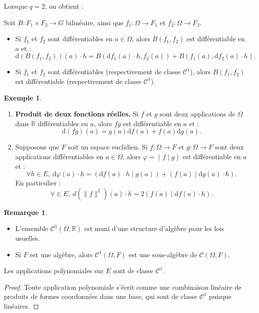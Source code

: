 \documentclass[french]{article}
\newcommand{\R}{\mathbb{R}}
\renewcommand{\d}{\text{d}}
\theoremstyle{plain}
\theoremstyle{definition}
\newtheorem*{ex}{Exemple}
\newtheorem*{rmq}{Remarque}
\theoremstyle{remark}
\begin{document}
Lorsque $q=2$, on obtient :

\begin{cor}%
	Soit $B: F_1\times F_2\to G$ bilinéaire, ainsi que $f_1:\Omega\to F_1$ et $f_2:\Omega\to F_2$.
	\begin{itemize}
		\item Si $f_1$ et $f_2$ sont différentiables en $a\in\Omega$, alors $B(f_1,f_2)$ est différentiable en $a$ et :
		$$\d(B(f_1,f_2))(a)\cdot h=B(\d f_1(a)\cdot h, f_2(a))+B(f_1(a),\d f_2(a)\cdot h).$$
		\item Si $f_1$ et $f_2$ sont différentiables (respectivement de classe $\mathcal{C}^1$), alors $B(f_1,f_2)$ est différentiable (respectivement de classe $\mathcal{C}^1$).
	\end{itemize}
\end{cor}

\begin{ex}
	\begin{enumerate}
		\item \textbf{Produit de deux fonctions réelles.} Si $f$ et $g$ sont deux applications de $\Omega$ dans $\R$ différentiables en $a$, alors $fg$ est différentiable en $a$ et :
		$$\d (fg)(a)=g(a)\d f(a)+f(a)\d g(a).$$
		\item Supposons que $F$ soit un espace euclidien. Si $f:\Omega\to F$ et $g:\Omega\to F$ sont deux applications différentiables en $a\in\Omega$, alors $\varphi=(f\mid g)$ est différentiable en $a$ et :
		$$\forall h\in E,\ \d\varphi(a)\cdot h=(\d f(a)\cdot h\mid g(a))+(f(a)\mid\d g(a)\cdot h).$$
		En particulier :
		$$\forall\in E,\ d(\lVert f\rVert^2)(a)\cdot h=2(f(a)\mid\d f(a)\cdot h).$$
	\end{enumerate}
\end{ex}

\begin{rmq}
	\begin{itemize}
		\item L'ensemble $\mathcal{C}^1(\Omega,\R)$ est muni d'une structure d'algèbre pour les lois usuelles.
		\item Si $F$ est une algèbre, alors $\mathcal{C}^1(\Omega,F)$ est une sous-algèbre de $\mathcal{C}(\Omega,F)$.
	\end{itemize}
\end{rmq}

\begin{prop}%
	Les applications polynomiales sur $E$ sont de classe $\mathcal{C}^1$.
\end{prop}
\begin{proof}
	Toute application polynomiale s'écrit comme une combinaison linéaire de produits de formes coordonnées dans une base, qui sont de classe $\mathcal{C}^1$ puisque linéaires.
\end{proof}
\end{document}
